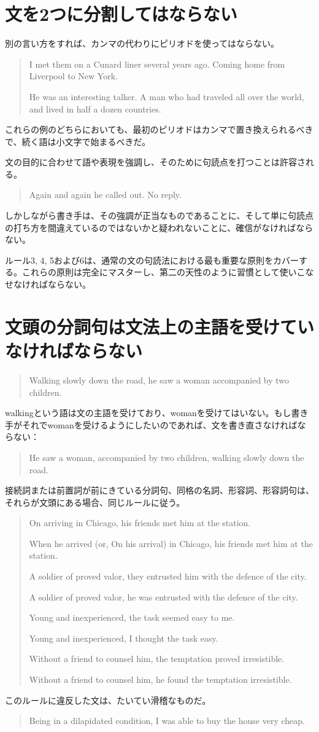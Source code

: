 \section{文を2つに分割してはならない}
別の言い方をすれば、カンマの代わりにピリオドを使ってはならない。
\begin{quote}
I met them on a Cunard liner several years ago. Coming home from
Liverpool to New York.

He was an interesting talker. A man who had traveled all over the world,
and lived in half a dozen countries.
\end{quote}
これらの例のどちらにおいても、最初のピリオドはカンマで置き換えられるべきで、続く語は小文字で始まるべきだ。
\par
文の目的に合わせて語や表現を強調し、そのために句読点を打つことは許容される。
\begin{quote}
Again and again he called out. No reply.    
\end{quote}
しかしながら書き手は、その強調が正当なものであることに、そして単に句読点の打ち方を間違えているのではないかと疑われないことに、確信がなければならない。
\par 
ルール3, 4,
5および6は、通常の文の句読法における最も重要な原則をカバーする。これらの原則は完全にマスターし、第二の天性のように習慣として使いこなせなければならない。
\section{文頭の分詞句は文法上の主語を受けていなければならない}
\begin{quote}
Walking slowly down the road, he saw a woman accompanied by two children.    
\end{quote}
walkingという語は文の主語を受けており、womanを受けてはいない。もし書き手がそれでwomanを受けるようにしたいのであれば、文を書き直さなければならない：
\begin{quote}
    He saw a woman, accompanied by two children, walking slowly down the road.
\end{quote}
接続詞または前置詞が前にきている分詞句、同格の名詞、形容詞、形容詞句は、それらが文頭にある場合、同じルールに従う。
\begin{quote}
On arriving in Chicago, his friends met him at the station.

When he arrived (or, On his arrival) in Chicago, his friends met
him at the station.

A soldier of proved valor, they entrusted him with the defence of
the city.

A soldier of proved valor, he was entrusted with the defence of the city.

Young and inexperienced, the task seemed easy to me.

Young and inexperienced, I thought the task easy.

Without a friend to counsel him, the temptation proved irresistible.

Without a friend to counsel him, he found the temptation
irresistible.
\end{quote}
このルールに違反した文は、たいてい滑稽なものだ。
\begin{quote}
Being in a dilapidated condition, I was able to buy the house very cheap.    
\end{quote}
